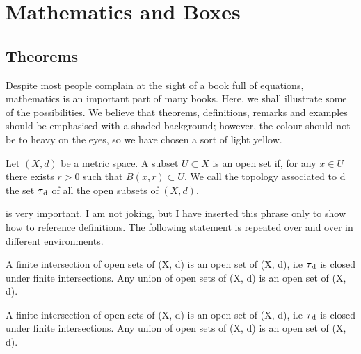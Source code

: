 \setchapterpreamble[u]{\margintoc}
\chapter{Mathematics and Boxes}

\section{Theorems}

Despite most people complain at the sight of a book full of equations, 
mathematics is an important part of many books. Here, we shall 
illustrate some of the possibilities. We believe that theorems, 
definitions, remarks and examples should be emphasised with a shaded 
background; however, the colour should not be to heavy on the eyes, so 
we have chosen a sort of light yellow.

\begin{definition}
Let $(X, d)$ be a metric space. A subset $U \subset X$ is an open set 
if, for any $x \in U$ there exists $r > 0$ such that $B(x, r) \subset 
U$. We call the topology associated to d the set $\tau\textsubscript{d}$ 
of all the open subsets of $(X, d).$
\end{definition}

 is very important. I am not joking, but I have inserted 
this phrase only to show how to reference definitions. The following 
statement is repeated over and over in different environments.

\begin{theorem}
A finite intersection of open sets of (X, d) is an open set of (X, d), 
i.e $\tau\textsubscript{d}$ is closed under finite intersections. Any 
union of open sets of (X, d) is an open set of (X, d).
\end{theorem}

\begin{proposition}
A finite intersection of open sets of (X, d) is an open set of (X, d), 
i.e $\tau\textsubscript{d}$ is closed under finite intersections. Any 
union of open sets of (X, d) is an open set of (X, d).
\end{proposition}

